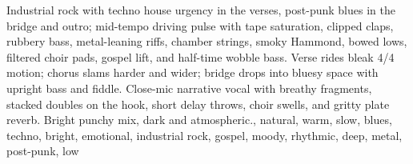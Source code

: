 
\begin{notes}
\end{notes}
\begin{style}
Industrial rock with techno house urgency in the verses, post-punk blues in the bridge and outro; mid-tempo driving pulse with tape saturation, clipped claps, rubbery bass, metal-leaning riffs, chamber strings, smoky Hammond, bowed lows, filtered choir pads, gospel lift, and half-time wobble bass. Verse rides bleak 4/4 motion; chorus slams harder and wider; bridge drops into bluesy space with upright bass and fiddle. Close-mic narrative vocal with breathy fragments, stacked doubles on the hook, short delay throws, choir swells, and gritty plate reverb. Bright punchy mix, dark and atmospheric., natural, warm, slow, blues, techno, bright, emotional, industrial rock, gospel, moody, rhythmic, deep, metal, post-punk, low
\end{style}

